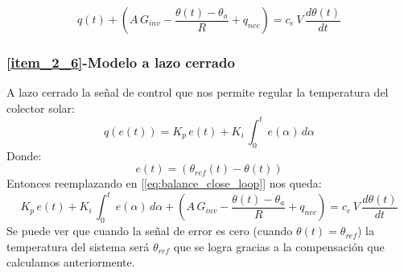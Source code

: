 \begin{equation}
   q(t)+ \left(A\,G_{inv}-\dfrac{\theta(t)-\theta_{a}}{R} + q_{nec}\right)=c_e\,V\,\dfrac{d\theta(t)}{dt}
   \label{eq:balance_close_loop}
\end{equation}

\subsubsection{\ref{item_2_6}-Modelo a lazo cerrado}
A lazo cerrado la señal de control que nos permite regular la temperatura del colector solar:
\begin{equation}
   q(e(t))=K_p\,e(t)+K_i\,\int_0^{t}\,e(\alpha)\,d\alpha
\end{equation}
Donde:
\begin{equation}
   e(t) = (\theta_{ref}(t)-\theta(t))
\end{equation}
Entonces reemplazando en [\ref{eq:balance_close_loop}] nos queda:
\begin{equation}
   K_p\,e(t)+K_i\,\int_0^{t}\,e(\alpha)\,d\alpha + \left(A\,G_{inv}-\dfrac{\theta(t)-\theta_{a}}{R} + q_{nec}\right)=
   c_e\,V\,\dfrac{d\theta(t)}{dt}
   \label{eq:close_loop}
\end{equation}
Se puede ver que cuando la señal de error es cero (cuando $\theta(t)=\theta_{ref}$) la temperatura del sistema será
$\theta_{ref}$ que se logra gracias a la compensación que calculamos anteriormente.

